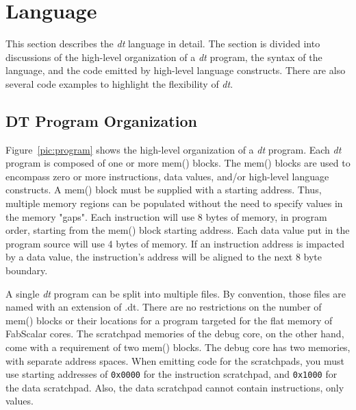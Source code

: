 \section{Language\label{sec:language}}

This section describes the \emph{dt} language in 
detail.  The section is divided into discussions of 
the high-level organization of a \emph{dt} program, 
the syntax of the language, and the code emitted by 
high-level language constructs.  There are also 
several code examples to highlight the flexibility 
of \emph{dt}.

\subsection{DT Program Organization}

Figure~\ref{pic:program} shows the high-level organization of a \emph{dt} program.
Each \emph{dt} program is composed of one or more mem() blocks.
The mem() blocks are used to encompass zero or more instructions, 
data values, and/or high-level language constructs.  A mem() block 
must be supplied with a starting address. Thus, multiple 
memory regions can be populated without the need to specify 
values in the memory "gaps". Each instruction will 
use 8 bytes of memory, in program order, starting from the mem() block
starting address.  Each data value put in the program source will 
use 4 bytes of memory.  If an instruction address is impacted
by a data value, the instruction's address will 
be aligned to the next 8 byte boundary. 

A single \emph{dt} program can be split into multiple files. 
By convention, those files are named with an extension of .dt. There 
are no restrictions on the number of mem() blocks or their 
locations for a program targeted for the flat memory of 
FabScalar cores.  The scratchpad memories of the debug core, on 
the other hand, come with a requirement of two mem() blocks. 
The debug core has two memories, with separate address spaces.
When emitting code for the scratchpads, you must use starting 
addresses of \texttt{0x0000} for the instruction scratchpad, and \texttt{0x1000}
for the data scratchpad.  Also, the data scratchpad cannot contain
instructions, only values.


